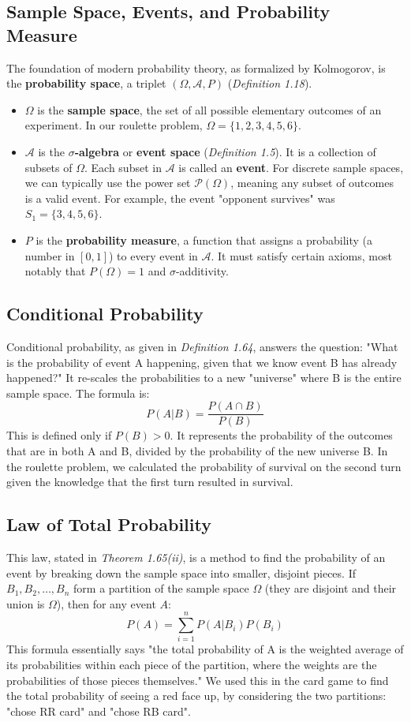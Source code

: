 \documentclass[11pt,a4paper]{article}
\theoremstyle{tutorstyle}
\begin{document}
\subsection{\hypertarget{concept_space}{Sample Space, Events, and Probability Measure}}
The foundation of modern probability theory, as formalized by Kolmogorov, is the \textbf{probability space}, a triplet $(\Omega, \mathcal{A}, P)$ (\textit{Definition 1.18}).
\begin{itemize}
    \item $\Omega$ is the \textbf{sample space}, the set of all possible elementary outcomes of an experiment. In our roulette problem, $\Omega = \{1,2,3,4,5,6\}$.
    \item $\mathcal{A}$ is the \textbf{$\sigma$-algebra} or \textbf{event space} (\textit{Definition 1.5}). It is a collection of subsets of $\Omega$. Each subset in $\mathcal{A}$ is called an \textbf{event}. For discrete sample spaces, we can typically use the power set $\mathcal{P}(\Omega)$, meaning any subset of outcomes is a valid event. For example, the event "opponent survives" was $S_1 = \{3,4,5,6\}$.
    \item $P$ is the \textbf{probability measure}, a function that assigns a probability (a number in $[0,1]$) to every event in $\mathcal{A}$. It must satisfy certain axioms, most notably that $P(\Omega)=1$ and $\sigma$-additivity.
\end{itemize}

\subsection{\hypertarget{concept_condprob}{Conditional Probability}}
Conditional probability, as given in \textit{Definition 1.64}, answers the question: "What is the probability of event A happening, given that we know event B has already happened?" It re-scales the probabilities to a new "universe" where B is the entire sample space. The formula is:
\[
P(A | B) = \frac{P(A \cap B)}{P(B)}
\]
This is defined only if $P(B) > 0$. It represents the probability of the outcomes that are in both A and B, divided by the probability of the new universe B. In the roulette problem, we calculated the probability of survival on the second turn given the knowledge that the first turn resulted in survival.

\subsection{\hypertarget{concept_totalprob}{Law of Total Probability}}
This law, stated in \textit{Theorem 1.65(ii)}, is a method to find the probability of an event by breaking down the sample space into smaller, disjoint pieces. If $B_1, B_2, \dots, B_n$ form a partition of the sample space $\Omega$ (they are disjoint and their union is $\Omega$), then for any event $A$:
\[
P(A) = \sum_{i=1}^{n} P(A | B_i) P(B_i)
\]
This formula essentially says "the total probability of A is the weighted average of its probabilities within each piece of the partition, where the weights are the probabilities of those pieces themselves." We used this in the card game to find the total probability of seeing a red face up, by considering the two partitions: "chose RR card" and "chose RB card".
\end{document}
